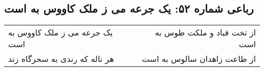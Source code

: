 \begin{center}
\section*{رباعی شماره ۵۲: یک جرعه می ز ملک کاووس به است}
\label{sec:sh052}
\begin{longtable}{l p{0.5cm} r}
یک جرعه می ز ملک کاووس به است
&&
از تخت قباد و ملکت طوس به است
\\
هر ناله که رندی به سحرگاه زند
&&
از طاعت زاهدان سالوس به است
\\
\end{longtable}
\end{center}
